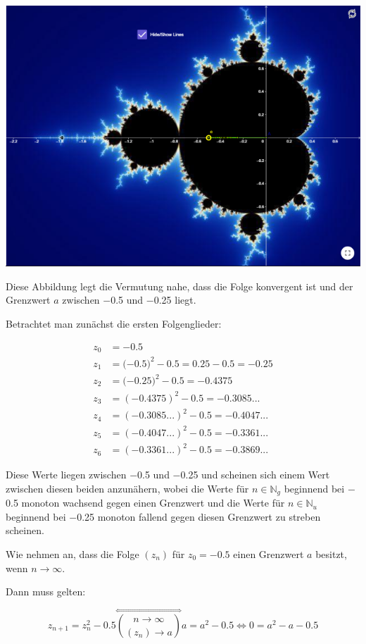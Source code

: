 \documentclass[a4paper, 12pt]{book}
\begin{document}
\begin{center}
\includegraphics[width=0.5\linewidth]{image12.png}
\end{center}


Diese Abbildung legt die Vermutung nahe, dass die Folge konvergent ist
und der Grenzwert \(a\) zwischen \(-\)0.5 und \(-\)0.25 liegt.


Betrachtet man zunächst die ersten Folgenglieder:

\begin{align*}
z_{0} &=  - 0.5\\
z_{1} &= ( - {0.5)}^{2} - 0.5 = 0.25 - 0.5 =  - 0.25\\
z_{2} &= ( - {0.25)}^{2} - 0.5 =  - 0.4375\\
z_{3} &= {( - 0.4375)}^{2} - 0.5 =  - 0.3085...\\
z_{4} &= {( - 0.3085...)}^{2} - 0.5 =  - 0.4047...\\
z_{5} &= {( - 0.4047...)}^{2} - 0.5 =  - 0.3361...\\
z_{6} &= {( - 0.3361...)}^{2} - 0.5 =  - 0.3869...
\end{align*}

Diese Werte liegen zwischen \(-\)0.5 und \(-\)0.25 und scheinen sich
einem Wert zwischen diesen beiden anzunähern, wobei die Werte für
\(n \in \mathbb{N}_{g}\) beginnend bei \(-\)0.5 monoton wachsend
gegen einen Grenzwert und die Werte für \(n \in \mathbb{N}_{u}\)
beginnend bei \(-\)0.25 monoton fallend gegen diesen Grenzwert zu
streben scheinen.

Wie nehmen an, dass die Folge \(\left( z_{n} \right)\) für
\(z_{0} =  - 0.5\) einen Grenzwert \(a\) besitzt, wenn
\(n \rightarrow \infty\).

Dann muss gelten:

\[z_{n + 1} = z_{n}^{2} - 0.5\overset{\Leftrightarrow}{\binom{n \rightarrow \infty}{\left( z_{n} \right) \rightarrow a}}a = a^{2} - 0.5 \Longleftrightarrow 0 = a^{2} - a - 0.5\]
\end{document}
